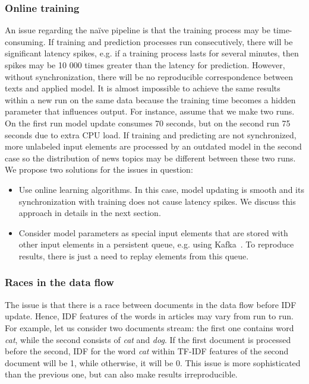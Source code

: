 \subsubsection{Online training}
An issue regarding the na\"ive pipeline is that the training process may be time-consuming. If training and prediction processes run consecutively, there will be significant latency spikes, e.g. if a training process lasts for several minutes, then spikes may be 10 000 times greater than the latency for prediction. However, without synchronization, there will be no reproducible correspondence between texts and applied model. It is almost impossible to achieve the same results within a new run on the same data because the training time becomes a hidden parameter that influences output. For instance, assume that we make two runs. On the first run model update consumes 70 seconds, but on the second run 75 seconds due to extra CPU load. If training and predicting are not synchronized, more unlabeled input elements are processed by an outdated model in the second case so the distribution of news topics may be different between these two runs. We propose two solutions for the issues in question:

\begin{itemize}
    \item Use online learning algorithms. In this case, model updating is smooth and its synchronization with training does not cause latency spikes. We discuss this approach in details in the next section.
    \item Consider model parameters as special input elements that are stored with other input elements in a persistent queue, e.g. using Kafka~\cite{kreps2011kafka}. To reproduce results, there is just a need to replay elements from this queue.
\end{itemize}

\subsubsection{Races in the data flow}
The issue is that there is a race between documents in the data flow before IDF update. Hence, IDF features of the words in articles may vary from run to run. For example, let us consider two documents stream: the first one contains word {\em cat}, while the second consists of {\em cat} and {\em dog}. If the first document is processed before the second, IDF for the word {\em cat} within TF-IDF features of the second document will be 1, while otherwise, it will be 0. This issue is more sophisticated than the previous one, but can also make results irreproducible. 

